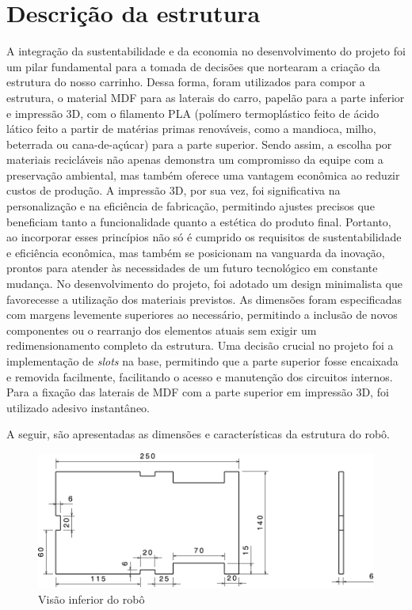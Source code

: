 \section{Descrição da estrutura}

A integração da sustentabilidade e da economia no desenvolvimento do projeto foi
um pilar fundamental para a tomada de decisões que nortearam a criação da
estrutura do nosso carrinho. Dessa forma, foram utilizados para compor a
estrutura, o material MDF para as laterais do carro, papelão para a parte
inferior e impressão 3D, com o filamento PLA (polímero termoplástico feito de
ácido lático feito a partir de matérias primas renováveis, como a mandioca,
milho, beterrada ou cana-de-açúcar) para a parte superior. Sendo assim, a
escolha por materiais recicláveis não apenas demonstra um compromisso da equipe
com a preservação ambiental, mas também oferece uma vantagem econômica ao
reduzir custos de produção. A impressão 3D, por sua vez, foi significativa na
personalização e na eficiência de fabricação, permitindo ajustes precisos que
beneficiam tanto a funcionalidade quanto a estética do produto final. Portanto,
ao incorporar esses princípios não só é cumprido os requisitos de
sustentabilidade e eficiência econômica, mas também se posicionam na vanguarda
da inovação, prontos para atender às necessidades de um futuro tecnológico em
constante mudança. No desenvolvimento do projeto, foi adotado um design
minimalista que favorecesse a utilização dos materiais previstos. As dimensões
foram especificadas com margens levemente superiores ao necessário, permitindo a
inclusão de novos componentes ou o rearranjo dos elementos atuais sem exigir um
redimensionamento completo da estrutura. Uma decisão crucial no projeto foi a
implementação de \textit{slots} na base, permitindo que a parte superior fosse
encaixada e removida facilmente, facilitando o acesso e manutenção dos circuitos
internos. Para a fixação das laterais de MDF com a parte superior em impressão
3D, foi utilizado adesivo instantâneo.

A seguir, são apresentadas as dimensões e características da estrutura do robô.

\begin{figure}[htb]
  \caption{\label{fig:structure-down} Visão inferior do robô}

  \begin{center}
    \includegraphics[scale=0.525,page=1]{../img/structure.pdf}
  \end{center}

\end{figure}

